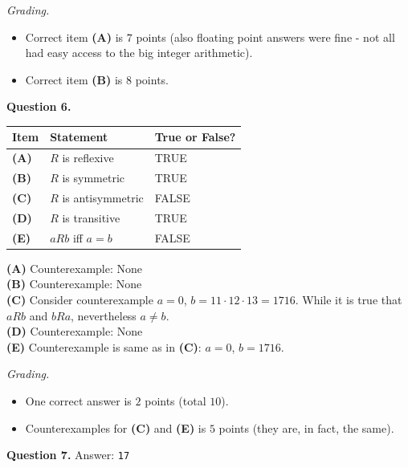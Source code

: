 \documentclass[jou]{apa6}
\begin{document}
{\scriptsize
{\em Grading.} 
\begin{itemize}
\item Correct item {\bf (A)} is $7$ points (also floating point answers were fine - 
not all had easy access to the big integer arithmetic). 
\item Correct item {\bf (B)} is $8$ points.
\end{itemize}
}


\vspace{10pt}
{\bf Question 6.}\\

\begin{tabular}{|l|l|l|} \hline
{\bf Item} & {\bf Statement} & {\bf True or False?} \\ \hline
{\bf (A)} & $R$ is reflexive & TRUE \\ \hline
{\bf (B)} & $R$ is symmetric & TRUE \\ \hline
{\bf (C)} & $R$ is antisymmetric & FALSE \\ \hline
{\bf (D)} & $R$ is transitive & TRUE \\ \hline
{\bf (E)} & $aRb$ iff $a=b$ & FALSE \\ \hline
\end{tabular}


{\bf (A)} Counterexample: None\\
{\bf (B)} Counterexample: None\\
{\bf (C)} Consider counterexample $a=0$, $b = 11 \cdot 12 \cdot 13 = 1716$.  
While it is true that $aRb$ and $bRa$, nevertheless $a \neq b$.\\
{\bf (D)} Counterexample: None\\
{\bf (E)} Counterexample is same as in {\bf (C)}: $a=0$, $b = 1716$.

{\scriptsize
{\em Grading.} 
\begin{itemize} 
\item One correct answer is $2$ points (total $10$).
\item Counterexamples for {\bf (C)} and {\bf (E)} is $5$ points (they are, in fact, the same). 
\end{itemize}
}



\vspace{10pt}
{\bf Question 7.} Answer: {\tt 17}\\
\end{document}
